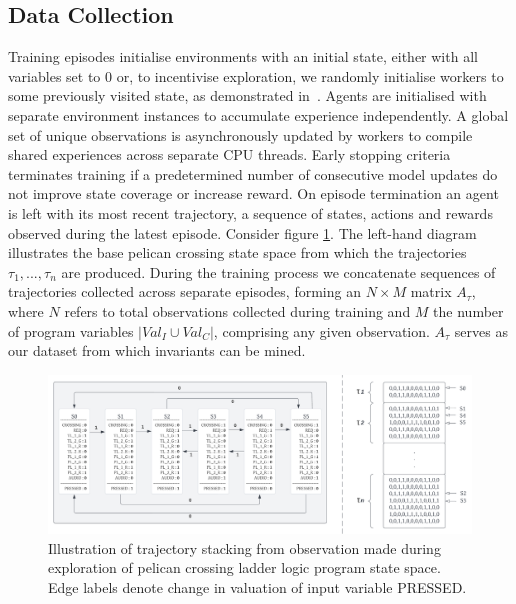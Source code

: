 \documentclass[runningheads]{llncs}
\begin{document}
\subsection{Data Collection}
Training episodes initialise environments with an initial state, either with all variables set to 0 or, to incentivise exploration, we randomly initialise workers to some previously visited state, as demonstrated in~\cite{gordillo2021improving}. Agents are initialised with separate environment instances to accumulate experience independently. A global set of unique observations is asynchronously updated by workers to compile shared experiences across separate CPU threads. Early stopping criteria terminates training if a predetermined number of consecutive model updates do not improve state coverage or increase reward. On episode termination an agent is left with its most recent trajectory, a sequence of states, actions and rewards observed during the latest episode. 
Consider figure \ref{fig:trajectories}. The left-hand diagram illustrates the base pelican crossing state space from which the trajectories $\tau_1,...,\tau_n$ are produced. During the training process we concatenate sequences of trajectories collected across separate episodes, forming an $N\times M$ matrix $A_{\tau}$,  where $N$ refers to total observations collected during training and $M$ the number of program variables  $|Val_{I} \cup Val_{C}|$, comprising any given observation. $A_\tau$ serves as our dataset from which invariants can be mined.   
\begin{figure}[!t]
	\centering
	\label{fig:trajectories}
	\includegraphics[width=\columnwidth]{figs/trajectory_stacks.png}
	\caption{Illustration of trajectory stacking from observation made during exploration of pelican crossing ladder logic program state space. Edge labels denote change in valuation of input variable PRESSED.}
\end{figure}
\end{document}
